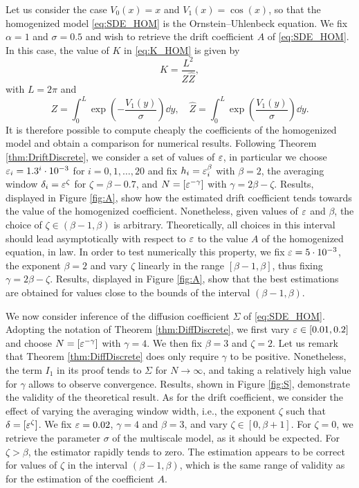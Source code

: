 \documentclass[10pt]{article}
\begin{document}
Let us consider the case $V_0(x) = x$ and $V_1(x) = \cos(x)$, so that the homogenized model \eqref{eq:SDE_HOM} is the Ornstein--Uhlenbeck equation. We fix $\alpha = 1$ and $\sigma = 0.5$ and wish to retrieve the drift coefficient $A$ of \eqref{eq:SDE_HOM}. In this case, the value of $K$ in \eqref{eq:K_HOM} is given by
\begin{equation}
	K = \frac{L^2}{Z\widehat Z},
\end{equation}
with $L = 2\pi$ and 
\begin{equation}
	Z = \int_0^L \exp\left(-\frac{V_1(y)}{\sigma}\right) \dd y, \quad \widehat Z = \int_0^L \exp\left(\frac{V_1(y)}{\sigma}\right) \dd y.
\end{equation}
It is therefore possible to compute cheaply the coefficients of the homogenized model and obtain a comparison for numerical results. Following Theorem \ref{thm:DriftDiscrete}, we consider a set of values of $\varepsilon$, in particular we choose $\varepsilon_i = 1.3^i \cdot 10^{-3}$ for $i = 0, 1, \ldots, 20$ and fix $h_i = \varepsilon_i^\beta$ with $\beta = 2$, the averaging window $\delta_i = \varepsilon^\zeta$ for $\zeta = \beta - 0.7$, and $N = [\varepsilon^{-\gamma}]$ with $\gamma = 2\beta - \zeta$. Results, displayed in Figure \ref{fig:A}, show how the estimated drift coefficient tends towards the value of the homogenized coefficient. Nonetheless, given values of $\varepsilon$ and $\beta$, the choice of $\zeta \in (\beta - 1, \beta)$ is arbitrary. Theoretically, all choices in this interval should lead asymptotically with respect to $\varepsilon$ to the value $A$ of the homogenized equation, in law. In order to test numerically this property, we fix $\varepsilon = 5\cdot 10^{-3}$, the exponent $\beta = 2$ and vary $\zeta$ linearly in the range $[\beta - 1, \beta]$, thus fixing $\gamma = 2\beta - \zeta$. Results, displayed in Figure \ref{fig:A}, show that the best estimations are obtained for values close to the bounds of the interval $(\beta-1, \beta)$.

We now consider inference of the diffusion coefficient $\Sigma$ of \eqref{eq:SDE_HOM}. Adopting the notation of Theorem \ref{thm:DiffDiscrete}, we first vary $\varepsilon \in [0.01, 0.2]$ and choose $N = [\varepsilon^{-\gamma}]$ with $\gamma = 4$. We then fix $\beta = 3$ and $\zeta = 2$. Let us remark that Theorem \ref{thm:DiffDiscrete} does only require $\gamma$ to be positive. Nonetheless, the term $I_1$ in its proof tends to $\Sigma$ for $N\to\infty$, and taking a relatively high value for $\gamma$ allows to observe convergence. Results, shown in Figure \ref{fig:S}, demonstrate the validity of the theoretical result. As for the drift coefficient, we consider the effect of varying the averaging window width, i.e., the exponent $\zeta$ such that $\delta = [\varepsilon^{\zeta}]$. We fix $\varepsilon = 0.02$, $\gamma = 4$ and $\beta = 3$, and vary $\zeta \in [0, \beta+1]$. For $\zeta = 0$, we retrieve the parameter $\sigma$ of the multiscale model, as it should be expected. For $\zeta > \beta$, the estimator rapidly tends to zero. The estimation appears to be correct for values of $\zeta$ in the interval $(\beta-1, \beta)$, which is the same range of validity as for the estimation of the coefficient $A$.
\end{document}
